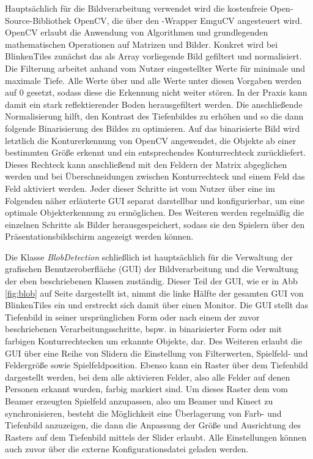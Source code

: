 Hauptsächlich für die Bildverarbeitung verwendet wird die kostenfreie Open-Source-Bibliothek OpenCV, die über den \CS{}-Wrapper EmguCV angesteuert wird. OpenCV erlaubt die Anwendung von Algorithmen und grundlegenden mathematischen Operationen auf Matrizen und Bilder. Konkret wird bei BlinkenTiles zunächst das als Array vorliegende Bild gefiltert und normalisiert. Die Filterung arbeitet anhand vom Nutzer eingestellter Werte für minimale und maximale Tiefe. Alle Werte über und alle Werte unter diesen Vorgaben werden auf 0 gesetzt, sodass diese die Erkennung nicht weiter stören. In der Praxis kann damit ein stark reflektierender Boden herausgefiltert werden. Die anschließende Normalisierung hilft, den Kontrast des Tiefenbildes zu erhöhen und so die dann folgende Binarisierung des Bildes zu optimieren. Auf das binarisierte Bild wird letztlich die Konturerkennung von OpenCV angewendet, die Objekte ab einer bestimmten Größe erkennt und ein entsprechendes Konturrechteck zurückliefert. Dieses Rechteck kann anschließend mit den Feldern der Matrix abgeglichen werden und bei Überschneidungen zwischen Konturrechteck und einem Feld das Feld aktiviert werden. Jeder dieser Schritte ist vom Nutzer über eine im Folgenden näher erläuterte GUI separat darstellbar und konfigurierbar, um eine optimale Objekterkennung zu ermöglichen. Des Weiteren werden regelmäßig die einzelnen Schritte als Bilder herausgespeichert, sodass sie den Spielern über den Präsentationsbildschirm angezeigt werden können.

Die Klasse \emph{BlobDetection} schließlich ist hauptsächlich für die Verwaltung der grafischen Benutzeroberfläche (GUI) der Bildverarbeitung und die Verwaltung der eben beschriebenen Klassen zuständig. Dieser Teil der GUI, wie er in Abb \ref{fig:blob} auf Seite \pageref{gui} dargestellt ist, nimmt die linke Hälfte der gesamten GUI von BlinkenTiles ein und erstreckt sich damit über einen Monitor. Die GUI stellt das Tiefenbild in seiner ursprünglichen Form oder nach einem der zuvor beschriebenen Verarbeitungsschritte, bspw. in binarisierter Form oder mit farbigen Konturrechtecken um erkannte Objekte, dar. Des Weiteren erlaubt die GUI über eine Reihe von Slidern die Einstellung von Filterwerten, Spielfeld- und Feldergröße sowie Spielfeldposition. Ebenso kann ein Raster über dem Tiefenbild dargestellt werden, bei dem alle aktivieren Felder, also alle Felder auf denen Personen erkannt wurden, farbig markiert sind. Um dieses Raster dem vom Beamer erzeugten Spielfeld anzupassen, also um Beamer und Kinect zu synchronisieren, besteht die Möglichkeit eine Überlagerung von Farb- und Tiefenbild anzuzeigen, die dann die Anpassung der Größe und Ausrichtung des Rasters auf dem Tiefenbild mittels der Slider erlaubt. Alle Einstellungen können auch zuvor über die externe Konfigurationsdatei geladen werden.

